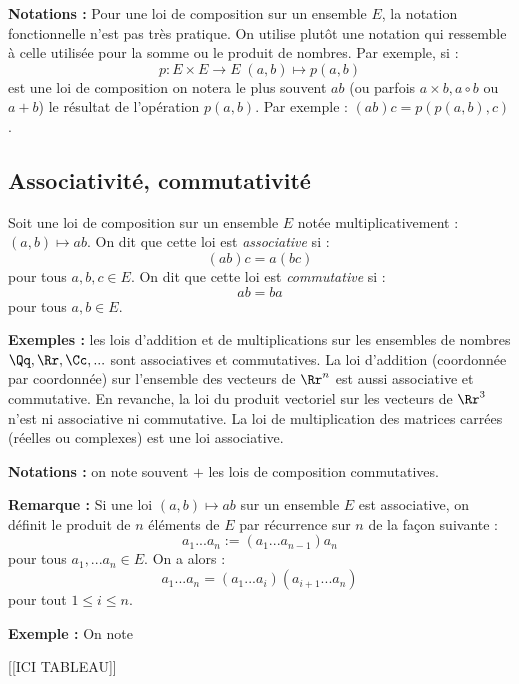 \documentclass[class=report,crop=false]{standalone}
\begin{document}
{\bf Notations :} Pour une loi de composition sur un ensemble $E$,  la notation fonctionnelle n'est pas très pratique. On utilise plutôt une notation qui ressemble à celle utilisée pour la somme ou le produit de nombres. Par exemple, si :
\[p : E \times E \to E \; (a,b) \mapsto p(a,b)\]
est une loi de composition on notera le plus souvent $ab$ (ou parfois $ a \times b, a \circ b$ ou $ a + b$) le résultat de l'opération $p(a,b)$. Par exemple : $(ab)c=p(p(a,b),c)$.

\subsection{Associativité, commutativité}

\begin{definition}
Soit une loi de composition sur un ensemble $E$ notée multiplicativement : $(a,b) \mapsto ab$. On dit que cette loi est {\it associative} si :
\[(ab)c = a(bc)\]
pour tous $a,b,c \in E$. On dit que cette loi est {\it commutative} si :
\[ab=ba\]
pour tous $a,b \in E$.
\end{definition}

{\bf Exemples :} les lois d'addition et de multiplications sur les ensembles de nombres $\Qq,\Rr,\Cc,...$ sont associatives et commutatives. La  loi d'addition (coordonnée par coordonnée) sur l'ensemble des vecteurs de $\Rr^n$ est aussi associative et commutative. En revanche, la loi du produit vectoriel sur les vecteurs de $\Rr^3$ n'est ni associative ni commutative. La loi de multiplication des matrices carrées (réelles ou complexes) est une loi associative.

{\bf Notations :} on note souvent $+$ les lois de composition commutatives.

{\bf Remarque :} Si une loi $(a,b) \mapsto ab$ sur un ensemble $E$ est associative, on définit le produit de $n$ éléments de $E$ par récurrence sur $n$ de la façon suivante :
\[a_1...a_n := (a_1...a_{n-1})a_n\]
pour tous $a_1,...a_n \in E$. On a alors :\[a_1...a_n = (a_1...a_i)(a_{i+1}...a_n)\] pour tout $1 \le i \le n$.

{\bf Exemple :}
On note 

[[ICI TABLEAU]]

\end{document}
